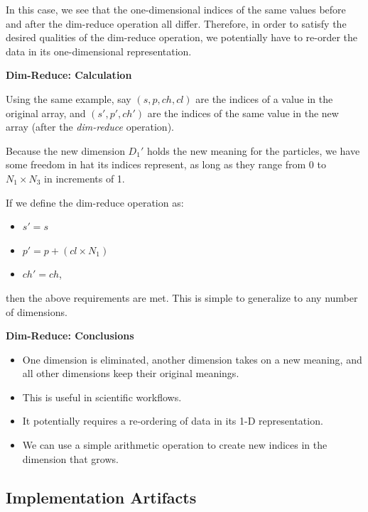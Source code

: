 \documentclass[conference]{IEEEtran}
\newcommand{\subsubsubsection}{\noindent\textbf}
\begin{document}
In this case, we see that the one-dimensional indices of the same values before
and after the dim-reduce operation all differ. Therefore, in order to satisfy
the desired qualities of the dim-reduce operation, we potentially have to
re-order the data in its one-dimensional representation.

\subsubsubsection{Dim-Reduce: Calculation}

Using the same example, say $(s, p, ch, cl)$ are the indices of a value in the
original array, and $(s', p', ch')$ are the indices of the same value in the
new array (after the {\em dim-reduce} operation).

Because the new dimension $D_1'$ holds the new meaning for the particles, we
have some freedom in hat its indices represent, as long as they range from 0 to
$N_1{\times}N_3$ in increments of 1.

If we define the dim-reduce operation as:

\begin{itemize}

\item $s' = s$

\item $p' = p + (cl{\times}N_1)$

\item $ch' = ch$,

\end{itemize}

then the above requirements are met. This is simple to generalize to any number
of dimensions.

\subsubsubsection{Dim-Reduce: Conclusions}

\begin{itemize}

\item One dimension is eliminated, another dimension takes on a new meaning, and all other dimensions keep their original meanings.

\item This is useful in scientific workflows.

\item It potentially requires a re-ordering of data in its 1-D representation.

\item We can use a simple arithmetic operation to create new indices in the
dimension that grows.

\end{itemize}

\subsection{Implementation Artifacts}
\end{document}
